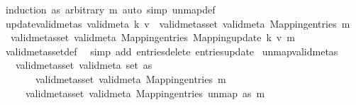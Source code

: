 \begin{isabellebody}
\ {\isacharparenleft}{\kern0pt}induction\ as\ arbitrary{\isacharcolon}{\kern0pt}\ m{\isacharparenright}{\kern0pt}\ {\isacharparenleft}{\kern0pt}auto\ simp{\isacharcolon}{\kern0pt}\ un{\isacharunderscore}{\kern0pt}map{\isacharunderscore}{\kern0pt}def{\isacharparenright}{\kern0pt}%
\endisatagproof
{\isafoldproof}%
%
\isadelimproof
\isanewline
%
\endisadelimproof
\isanewline
{}\isamarkupfalse%
\ update{\isacharunderscore}{\kern0pt}valid{\isacharunderscore}{\kern0pt}metas{\isacharcolon}{\kern0pt}\ {\isachardoublequoteopen}valid{\isacharunderscore}{\kern0pt}meta\ k\ v\ {\isasymLongrightarrow}\ valid{\isacharunderscore}{\kern0pt}metas{\isacharunderscore}{\kern0pt}set\ valid{\isacharunderscore}{\kern0pt}meta\ {\isacharparenleft}{\kern0pt}Mapping{\isachardot}{\kern0pt}entries\ m{\isacharparenright}{\kern0pt}\ {\isasymLongrightarrow}\isanewline
\ \ valid{\isacharunderscore}{\kern0pt}metas{\isacharunderscore}{\kern0pt}set\ valid{\isacharunderscore}{\kern0pt}meta\ {\isacharparenleft}{\kern0pt}Mapping{\isachardot}{\kern0pt}entries\ {\isacharparenleft}{\kern0pt}Mapping{\isachardot}{\kern0pt}update\ k\ v\ m{\isacharparenright}{\kern0pt}{\isacharparenright}{\kern0pt}{\isachardoublequoteclose}\isanewline
%
\isadelimproof
\ \ %
\endisadelimproof
%
\isatagproof
{}\isamarkupfalse%
\ valid{\isacharunderscore}{\kern0pt}metas{\isacharunderscore}{\kern0pt}set{\isacharunderscore}{\kern0pt}def\ \isamarkupfalse%
\ {\isacharparenleft}{\kern0pt}simp\ add{\isacharcolon}{\kern0pt}\ entries{\isacharunderscore}{\kern0pt}delete\ entries{\isacharunderscore}{\kern0pt}update{\isacharparenright}{\kern0pt}%
\endisatagproof
{\isafoldproof}%
%
\isadelimproof
\isanewline
%
\endisadelimproof
\isanewline
{}\isamarkupfalse%
\ un{\isacharunderscore}{\kern0pt}map{\isacharunderscore}{\kern0pt}valid{\isacharunderscore}{\kern0pt}metas{\isacharcolon}{\kern0pt}\isanewline
\ \ \ {\isachardoublequoteopen}valid{\isacharunderscore}{\kern0pt}metas{\isacharunderscore}{\kern0pt}set\ valid{\isacharunderscore}{\kern0pt}meta\ {\isacharparenleft}{\kern0pt}set\ as{\isacharparenright}{\kern0pt}{\isachardoublequoteclose}\isanewline
\ \ \ \ \ \ \ {\isachardoublequoteopen}valid{\isacharunderscore}{\kern0pt}metas{\isacharunderscore}{\kern0pt}set\ valid{\isacharunderscore}{\kern0pt}meta\ {\isacharparenleft}{\kern0pt}Mapping{\isachardot}{\kern0pt}entries\ m{\isacharparenright}{\kern0pt}{\isachardoublequoteclose}\isanewline
\ \ \ \ \ {\isachardoublequoteopen}valid{\isacharunderscore}{\kern0pt}metas{\isacharunderscore}{\kern0pt}set\ valid{\isacharunderscore}{\kern0pt}meta\ {\isacharparenleft}{\kern0pt}Mapping{\isachardot}{\kern0pt}entries\ {\isacharparenleft}{\kern0pt}un{\isacharunderscore}{\kern0pt}map\ as\ m{\isacharparenright}{\kern0pt}{\isacharparenright}{\kern0pt}{\isachardoublequoteclose}\isanewline

\end{isabellebody}
